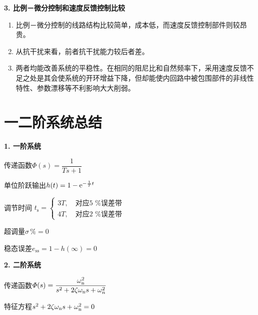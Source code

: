 \noindent \textbf{3. 比例－微分控制和速度反馈控制比较}
\begin{enumerate}[\hspace*{2em}(1)]
	\item 比例－微分控制的线路结构比较简单，成本低，而速度反馈控制部件则较昂贵。
	\item 从抗干扰来看，前者抗干扰能力较后者差。
	\item 两者均能改善系统的平稳性。在相同的阻尼比和自然频率下，采用速度反馈不足之处是其会使系统的开环增益下降，但却能使内回路中被包围部件的非线性特性、参数漂移等不利影响大大削弱。
\end{enumerate}


\section{一二阶系统总结}
\noindent \textbf{1. 一阶系统}
\begin{myitemize}
	\item 传递函数$\displaystyle \varPhi(s) = \dfrac{1}{Ts + 1}$
	\item 单位阶跃输出$h(t) = 1 - {\rm{e}}^{- \frac{1}{T} t}$
	\item 调节时间
	$t_{\text{s}} = \begin{cases}
		3T, \quad \mbox{对应5 \%误差带}\\
		4T, \quad \mbox{对应2 \%误差带}
	\end{cases}$
	\item 超调量$\sigma \,\% = 0$
	\item 稳态误差$e_{\text{ss}} = 1 - h(\infty) = 0$\vspace*{0.3em}
\end{myitemize}
\vspace*{0.5em}
\noindent \textbf{2. 二阶系统}
\begin{myitemize}
	\item 传递函数$\displaystyle \varPhi(s) = \dfrac{\omega_{\rm{n}}^2}{s^2 + 2 \zeta \omega_{\rm{n}} s + \omega_n^2}$
	\item 特征方程$s^2 + 2\zeta \omega_{\rm{n}} s +\omega_{\rm{n}}^2 = 0$
	\vspace*{0.3em}
\end{myitemize}
